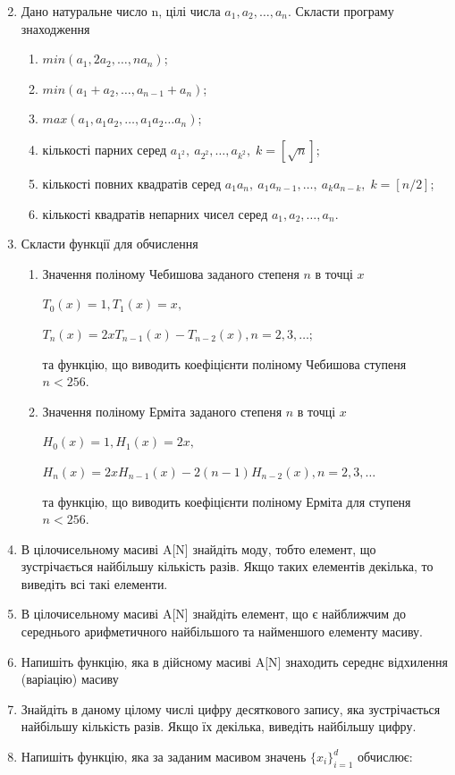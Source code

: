 \documentclass[a5paper,titlepage,openany,twoside,
]
{book_unv}%
\makeatletter
\newcommand{\xslalph}[1]{\expandafter\@xslalph\csname c@#1\endcsname}
\newcommand{\@xslalph}[1]{%
    \ifcase#1\or а\or б\or в\or г\or д\or e\or є\or ж\or з\or i%
    \or й\or к\or л\or м\or н\or о\or п\or р\or с\or т%
    \or у\or ф\or х\or ц\or ч\or ш\or ю\or я\or аа\or бб\or вв%
    \else\@ctrerr\fi%
}
\makeatother
\begin{document}
\begin{enumerate}
\begin{multicols}{2}
\begin{enumerate}[label=\xslalph*)]
\end{enumerate}
 \end{multicols}

\item Дано натуральне число n, цілі числа \(a_{1},a_{2},\ldots,a_{n}\).
Скласти програму знаходження
  \begin{multicols}{2}
\begin{enumerate}[label=\xslalph*)]
\item
 \(min(a_{1},2a_{2},\ldots,na_{n})\);
\item \(min(a_{1} + a_{2},\ldots,a_{n - 1} + a_{n})\);
\item \(max(a_{1},a_{1}a_{2},\ldots,a_{1}a_{2}\ldots a_{n})\);
\item кількості парних серед \(a_{1^2},\ a_{2^2},\ldots,a_{k^2},\; k=[\sqrt{n}] \);
\item кількості повних квадратів серед \(a_{1}a_{n},\ a_{1}a_{n-1},\ldots,\ a_{k}a_{n-k},\; k=[n/2]\);
\item кількості квадратів непарних чисел серед
\(a_{1},a_{2},\ldots,a_{n}\).
\end{enumerate}
\end{multicols}

\item
Скласти функції для обчислення
\begin{enumerate}[label=\xslalph*)]
\item
Значення поліному Чебишова заданого степеня \(n\) в точці \(x\)

\(T_{0}(x) = 1,T_{1}(x) = x,\)

\(T_{n}(x) = 2xT_{n - 1}(x) - T_{n - 2}(x),n = 2,3,\ldots;\)

та функцію, що виводить коефіцієнти поліному Чебишова ступеня $n<256$.

\item
Значення поліному Ерміта заданого степеня \(n\) в точці \(x\)

\(H_{0}(x) = 1,H_{1}(x) = 2x,\)

\(H_{n}(x) = 2xH_{n - 1}(x) - 2(n - 1)H_{n - 2}(x),n = 2,3,\ldots\)

та функцію, що виводить коефіцієнти поліному Ерміта для ступеня $n<256$.
\end{enumerate}
\item
  В цілочисельному масиві A{[}N{]} знайдіть моду, тобто елемент, що
  зустрічається найбільшу кількість разів. Якщо таких елементів декілька,
  то виведіть всі такі елементи.

\item
  В цілочисельному масиві A{[}N{]} знайдіть елемент, що є найближчим до
  середнього арифметичного найбільшого та найменшого елементу масиву.
\item
  Напишіть функцію, яка в дійсному масиві A{[}N{]} знаходить середнє
  відхилення (варіацію) масиву
\item
  Знайдіть в даному цілому числі цифру десяткового запису, яка
  зустрічається найбільшу кількість разів. Якщо їх декілька, виведіть
  найбільшу цифру.
\item
  Напишіть функцію, яка за заданим масивом значень
  \({\{ x_{i}\}}_{i = 1}^{d}\) обчислює:


\end{enumerate}
\end{document}
